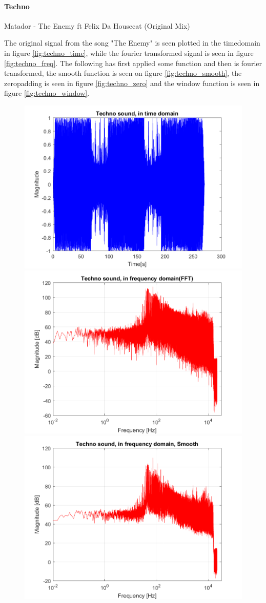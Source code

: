 \paragraph{Techno}
Matador - The Enemy ft Felix Da Housecat (Original Mix)


The original signal from the song "The Enemy" is seen plotted in the timedomain in figure \ref{fig:techno_time}, while the fourier transformed signal is seen in figure \ref{fig:techno_freq}. The following has first applied some function and then is fourier transformed, the smooth function is seen on figure \ref{fig:techno_smooth}, the zeropadding is seen in figure \ref{fig:techno_zero} and the window function is seen in figure \ref{fig:techno_window}.

\begin{figure}[htb!]
	\centering
	{\includegraphics[width=0.45\linewidth]{code/Techno_figure1.png}}
	{\includegraphics[width=0.45\linewidth]{code/Techno_figure2.png}}
	{\includegraphics[width=0.45\linewidth]{code/Techno_figure3.png}}

\end{figure}
